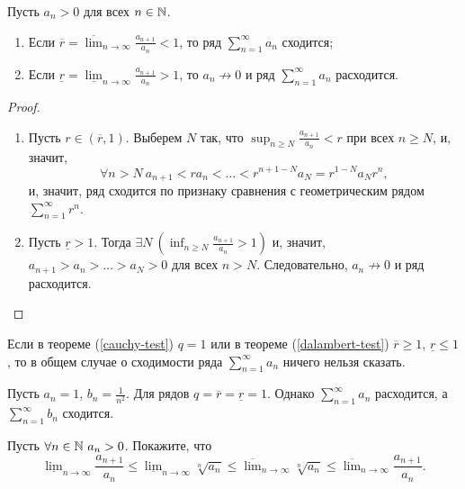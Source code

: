 \begin{theorem}
    \label{dalambert-test}
    Пусть $a_n > 0$ для всех $n \in \mathbb{N}$.

    \begin{enumerate}
        \item Если $\overline{r} = \overline{\lim}_{n \rightarrow \infty} \frac{a_{n + 1}}{a_n} < 1$, то ряд $\sum_{n = 1}^\infty a_n$ сходится;
        \item Если $\underline{r} = \underline{\lim}_{n \rightarrow \infty} \frac{a_{n + 1}}{a_n} > 1$, то $a_n \not\rightarrow 0$ и ряд $\sum_{n = 1}^\infty a_n$ расходится.
    \end{enumerate}

    \begin{proof}
        \begin{enumerate}
            \item Пусть  $r \in (\overline{r}, 1)$. Выберем $N$ так, что $\sup_{n \ge N} \frac{a_{n + 1}}{a_n} < r$ при всех $n \ge N$, и, значит,
                \[
                    \forall n > N \ a_{n + 1} < ra_n < \ldots < r^{n + 1 - N} a_{N} = r^{1 - N} a_N r^n,
                \]
                и, значит, ряд сходится по признаку сравнения с геометрическим рядом $\sum_{n = 1}^\infty r^n$.

            \item Пусть $\underline{r} > 1$. Тогда $\exists N \ \left(\inf_{n \ge N} \frac{a_{n + 1}}{a_n} > 1\right)$ и, значит, $a_{n + 1} > a_n > \ldots > a_N > 0$ для всех $n > N$. Следовательно, $a_n \not\rightarrow 0$ и ряд расходится.
        \end{enumerate}
    \end{proof}
\end{theorem}

\begin{note}
    Если в теореме (\ref{cauchy-test}) $q = 1$ или в теореме (\ref{dalambert-test}) $\overline{r} \ge 1$, $\underline{r} \le 1$, то в общем случае о сходимости ряда $\sum_{n = 1}^\infty a_n$ ничего нельзя сказать.

\begin{example}
    Пусть $a_n = 1$, $b_n = \frac{1}{n^2}$. Для рядов $q = \overline{r} = \underline{r} = 1$. Однако $\sum_{n = 1}^\infty a_n$ расходится, а $\sum_{n = 1}^\infty b_n$ сходится.
\end{example}
\end{note}

\begin{problem}
    Пусть $\forall n \in \mathbb{N} \ a_n > 0$. Покажите, что
    \[
        \underline{\lim}_{n \rightarrow \infty} \frac{a_{n + 1}}{a_n} \le \underline{\lim}_{n \rightarrow \infty} \sqrt[n]{a_n} \le \overline{\lim}_{n \rightarrow \infty} \sqrt[n]{a_n} \le \overline{\lim}_{n \rightarrow \infty} \frac{a_{n + 1}}{a_n}.
    \]
\end{problem}


